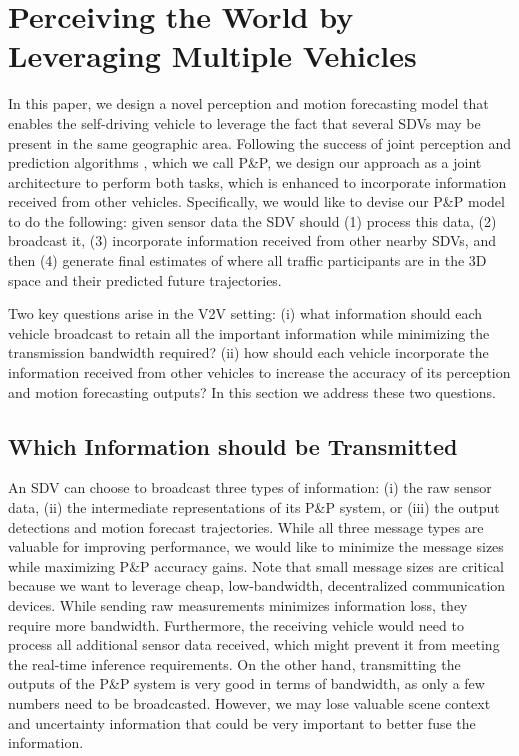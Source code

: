 \documentclass[runningheads]{llncs}
\newcommand{\pnp}{P\&P}
\begin{document}
\section{Perceiving the World by Leveraging Multiple Vehicles}


In this paper, we design a novel perception and motion forecasting  model that enables the self-driving vehicle to leverage the fact that several SDVs may be present in the same geographic area.
Following the success of joint perception and prediction
algorithms \cite{luo2018fast, casas2018intentnet, casas2019spatially, pnpnet}, which we call \pnp, we design our approach as a
joint
architecture to perform both tasks, which is enhanced to
incorporate information received from other vehicles.
Specifically, we would like to devise our \pnp{ } model to do the following: given sensor data
the SDV should (1) process this data, (2) broadcast it, (3) incorporate information received from other nearby SDVs, and then (4) generate final estimates of where all traffic participants are in the 3D space and their predicted future trajectories.

Two key questions arise in the V2V setting:
(i) what information should each vehicle broadcast to retain all the important information while minimizing the transmission bandwidth required?
(ii) how should each vehicle incorporate the information received from other vehicles to increase the accuracy of its perception and motion forecasting outputs?
In this section we address these two questions.

\subsection{Which Information should be Transmitted}
\label{sec:type_of_data}
An SDV can choose to broadcast three types of information:
(i) the raw sensor data, (ii) the intermediate representations of its \pnp{}
system, or (iii) the output detections and motion forecast trajectories.
While all three message types are valuable for improving performance, we would like to minimize the message sizes while maximizing
\pnp{} 
accuracy gains.
Note that small message sizes are critical because we want to leverage cheap, low-bandwidth, decentralized communication devices.
While sending raw measurements minimizes information loss, they require more bandwidth.
Furthermore, the receiving vehicle would need to process all additional 
sensor data received, which might prevent it from meeting the real-time inference requirements.
On the other hand, transmitting the outputs of the
\pnp{}
system is very good in terms of bandwidth, as only a few numbers need to be broadcasted.
However,  we may lose valuable scene context and uncertainty information that could be very important to better  fuse the information.
\end{document}
